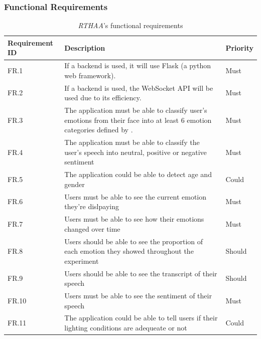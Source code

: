 \documentclass[12pt, a4paper]{article}
\begin{document}
\subsubsection{Functional Requirements}
\label{frs}

\begin{table}[H]
    \centering
    \begin{tabular}{|L{3.5cm}|L{8cm}|L{1.8cm}|}
        \hline
        \normalsize{\textbf{Requirement ID}} & \normalsize{\textbf{Description}} & \normalsize{\textbf{Priority}}
        \\ \hline
        FR.1 & If a backend is used, it will use Flask (a python web framework). & Must
        \\ \hline
        FR.2 & If a backend is used, the WebSocket API will be used due to its efficiency. & Must
        \\ \hline
        FR.3 & The application must be able to classify user's emotions from their face into at least 6 emotion categories defined by \cite{ekman}. & Must
        \\ \hline
        FR.4 & The application must be able to classify the user's speech into neutral, positive or negative sentiment & Must
        \\ \hline
        FR.5 & The application could be able to detect age and gender & Could
        \\ \hline
        FR.6 & Users must be able to see the current emotion they're dislpaying & Must
        \\ \hline
        FR.7 & Users must be able to see how their emotions changed over time & Must
        \\ \hline
        FR.8 & Users should be able to see the proportion of each emotion they showed throughout the experiment & Should
        \\ \hline
        FR.9 & Users should be able to see the transcript of their speech & Should
        \\ \hline
        FR.10 & Users must be able to see the sentiment of their speech & Must
        \\ \hline
        FR.11 & The application could be able to tell users if their lighting conditions are adequeate or not & Could
        \\ \hline

    \end{tabular}
    \caption{\textit{RTHAA}'s functional requirements}
    \label{tab:freq}
\end{table}
\end{document}
